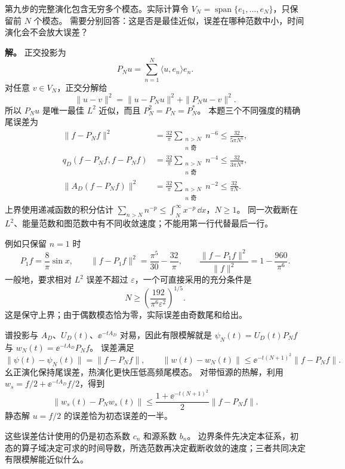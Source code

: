 \begin{exbox}[有限模计算的最佳性与误差]
第九步的完整演化包含无穷多个模态。实际计算令 $V_N=\operatorname{span}\{e_1,\ldots,e_N\}$，只保留前 $N$ 个模态。
需要分别回答：这是否是最佳近似，误差在哪种范数中小，时间演化会不会放大误差？

\textbf{解。} 正交投影为
\[
 P_Nu=\sum_{n=1}^N\langle u,e_n\rangle e_n.
\]
对任意 $v\in V_N$，正交分解给
\[
 \|u-v\|^2=\|u-P_Nu\|^2+\|P_Nu-v\|^2.
\]
所以 $P_Nu$ 是唯一最佳 $L^2$ 近似，而且 $P_N^2=P_N=P_N^*$。
本题三个不同强度的精确尾误差为
\begin{align*}
 \|f-P_Nf\|^2&=\frac{32}\pi\sum_{\substack{n>N\\n\text{ 奇}}}n^{-6}
 \le\frac{32}{5\pi N^5},\\
 q_D(f-P_Nf,f-P_Nf)&=\frac{32}\pi\sum_{\substack{n>N\\n\text{ 奇}}}n^{-4}
 \le\frac{32}{3\pi N^3},\\
 \|A_D(f-P_Nf)\|^2&=\frac{32}\pi\sum_{\substack{n>N\\n\text{ 奇}}}n^{-2}
 \le\frac{32}{\pi N}.
\end{align*}
上界使用递减函数的积分估计 $\sum_{n>N}n^{-p}\le\int_N^\infty x^{-p}\,\dd x$，$N\ge1$。
同一次截断在 $L^2$、能量范数和图范数中有不同收敛速度；不能用第一行代替最后一行。

例如只保留 $n=1$ 时
\[
 P_1f=\frac8\pi\sin x,\qquad
 \|f-P_1f\|^2=\frac{\pi^5}{30}-\frac{32}\pi,
 \qquad
 \frac{\|f-P_1f\|^2}{\|f\|^2}=1-\frac{960}{\pi^6}.
\]
一般地，要求相对 $L^2$ 误差不超过 $\varepsilon$，一个可直接采用的充分条件是
\[
 N\ge\left(\frac{192}{\pi^6\varepsilon^2}\right)^{1/5}.
\]
这是保守上界；由于偶数模态恰为零，实际误差由奇数尾和给出。

谱投影与 $A_D$、$U_D(t)$、$\ee^{-tA_D}$ 对易，因此有限模解就是 $\psi_N(t)=U_D(t)P_Nf$ 与 $w_N(t)=\ee^{-tA_D}P_Nf$。
误差满足
\[
 \|\psi(t)-\psi_N(t)\|=\|f-P_Nf\|,
 \qquad
 \|w(t)-w_N(t)\|\le \ee^{-t(N+1)^2}\|f-P_Nf\|.
\]
幺正演化保持尾误差，热演化更快压低高频尾模态。
对带恒源的热解，利用 $w_s=f/2+\ee^{-tA_D}f/2$，得到
\[
 \|w_s(t)-P_Nw_s(t)\|
 \le\frac{1+\ee^{-t(N+1)^2}}2\|f-P_Nf\|.
\]
静态解 $u=f/2$ 的误差恰为初态误差的一半。

这些误差估计使用的仍是初态系数 $c_n$ 和源系数 $b_n$。
边界条件先决定本征系，初态的算子域决定可求的时间导数，所选范数再决定截断收敛的速度；三者共同决定有限模解能近似什么。
\end{exbox}
